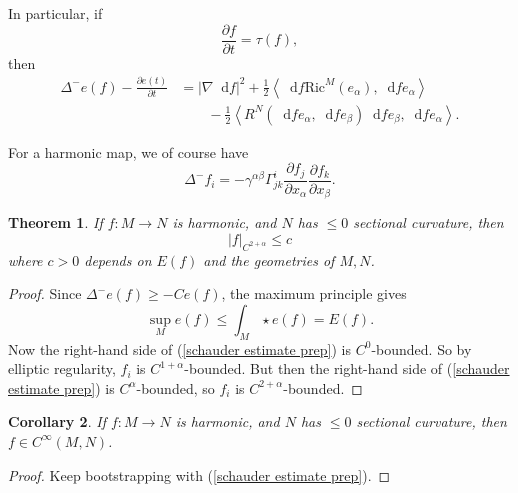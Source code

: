 \documentclass[reqno,12pt,letterpaper]{amsart}
\newcommand{\Ric}{\mathrm{Ric}}
\newcommand*\dif{\mathop{}\!\mathrm{d}}
\newcommand{\bral}{\left\langle}
\newcommand{\brar}{\right\rangle}
\newtheorem{theorem}{Theorem}[section]
\newtheorem{corollary}[theorem]{Corollary}
\theoremstyle{definition}
\numberwithin{equation}{section}
\begin{document}
In particular, if
$$\frac{\partial f}{\partial t} = \tau(f),$$
then 
\begin{align*}
\Delta^- e(f) - \frac{\partial e(t)}{\partial t} &= |\nabla \dif f|^2 + \frac{1}{2} \bral \dif f \Ric^M(e_\alpha), \dif f e_\alpha \brar \\
&\qquad - \frac{1}{2} \bral R^N (\dif f e_\alpha, \dif f e_\beta) \dif f e_\beta, \dif f e_\alpha \brar.
\end{align*}

For a harmonic map, we of course have 
\begin{equation}\label{schauder estimate prep}
\Delta^- f_i = -\gamma^{\alpha \beta} \Gamma_{jk}^i \frac{\partial f_j}{\partial x_\alpha} \frac{\partial f_k}{\partial x_\beta}.
\end{equation}

\begin{theorem}
If $f: M \to N$ is harmonic, and $N$ has $\leq 0$ sectional curvature, then 
$$|f|_{C^{2 + \alpha}} \leq c$$
where $c > 0$ depends on $E(f)$ and the geometries of $M, N$.
\end{theorem}
\begin{proof}
Since $\Delta^- e(f) \geq -C e(f)$, the maximum principle gives 
$$\sup_M e(f) \leq \int_M \star e(f) = E(f).$$
Now the right-hand side of (\ref{schauder estimate prep}) is $C^0$-bounded. So by elliptic regularity, $f_i$ is $C^{1 + \alpha}$-bounded.
But then the right-hand side of (\ref{schauder estimate prep}) is $C^\alpha$-bounded, so $f_i$ is $C^{2 + \alpha}$-bounded.
\end{proof}

\begin{corollary}
If $f: M \to N$ is harmonic, and $N$ has $\leq 0$ sectional curvature, then $f \in C^\infty(M, N)$.
\end{corollary}
\begin{proof}
Keep bootstrapping with (\ref{schauder estimate prep}).
\end{proof}

\printbibliography
\end{document}
